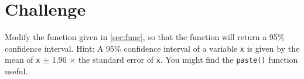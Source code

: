\documentclass[12pt,a4paper]{article}
\begin{document}
\section{Challenge}
\label{sec:cha}

Modify the function given in \ref{sec:func}, so that the function will
return a 95\% confidence interval. Hint: A 95\% confidence interval of
a variable \texttt{x} is given by the mean of \texttt{x} $\pm$ 1.96
$\times$ the
standard error of \texttt{x}. You might find the \texttt{paste()}
function useful.
\end{document}
